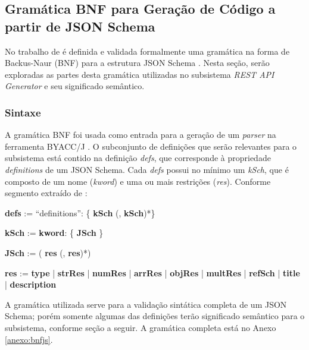 
\subsection{Gramática BNF para Geração de Código a partir de JSON Schema}
\label{sec:bnf}

No trabalho de  é definida e validada formalmente uma gramática na forma de Backus-Naur (BNF) para a estrutura JSON Schema \cite{GALIEGUE:2013}. Nesta seção, serão exploradas as partes desta gramática utilizadas no subsistema \textit{REST API Generator} e seu significado semântico.


\subsubsection{Sintaxe}
A gramática BNF foi usada como entrada para a geração de um \textit{parser} na ferramenta BYACC/J \cite{BYACCJ}. O subconjunto de definições que serão relevantes para o subsistema está contido na definição \textit{defs}, que corresponde à propriedade \textit{definitions} de um JSON Schema. Cada \textit{defs} possui no mínimo um \textit{kSch}, que é composto de um nome (\textit{kword}) e uma ou mais restrições (\textit{res}). Conforme segmento extraído de \cite{PEZOA:2016}:

\begin{algorithmic}
    \item \textbf{defs} := ``definitions'': \{ \textbf{kSch} (, \textbf{kSch})*\}
    \item \textbf{kSch} := \textbf{kword}: \{ \textbf{JSch} \}
    \item \textbf{JSch} := ( \textbf{res} (, \textbf{res})*)
    \item \textbf{res} := \textbf{type} | \textbf{strRes} | \textbf{numRes} | \textbf{arrRes} | \textbf{objRes} | \textbf{multRes} | \textbf{refSch} | \textbf{title} | \textbf{description}
\end{algorithmic}

A gramática utilizada serve para a validação sintática completa de um JSON Schema; porém somente algumas das definições terão significado semântico para o subsistema, conforme seção a seguir. A gramática completa está no Anexo \ref{anexo:bnfjs}.



